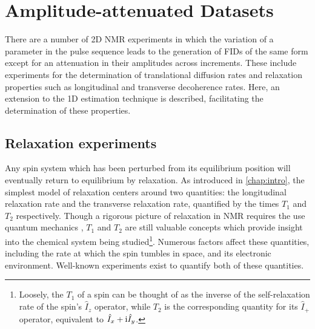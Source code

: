 \section{Amplitude-attenuated Datasets}
\label{sec:seq}
There are a number of \ac{2D} \ac{NMR} experiments in which the
variation of a parameter in the pulse sequence leads to the generation of
\acp{FID} of the same form except for an attenuation in their amplitudes across
increments. These include experiments for the determination of translational
diffusion rates and relaxation properties such as longitudinal and transverse
decoherence rates. Here, an extension to the \ac{1D} estimation technique is
described, facilitating the determination of these properties.

\subsection{Relaxation experiments}
\label{subsec:relaxation_experiments}
Any spin system which has been perturbed from its equilibrium position will
eventually return to equilibrium by relaxation. As introduced in
\cref{chap:intro}, the simplest model of relaxation centers around two
quantities: the longitudinal relaxation rate and the transverse relaxation
rate, quantified by the times $T_1$ and  $T_2$ respectively. Though a rigorous
picture of relaxation in \ac{NMR} requires the use quantum mechanics
\parencites[Chapter 5]{Cavanagh2007}{Goldman2001}{Kuprov2007}, $T_1$ and $T_2$
are still valuable concepts which provide insight into the chemical system
being studied\footnote{
    Loosely, the $T_1$ of a spin can be thought of as the inverse of the
    self-relaxation rate of the spin's $\hat{I}_z$ operator, while $T_2$ is the
    corresponding quantity for its $\hat{I}_+$ operator, equivalent to
    $\hat{I}_x + \mathrm{i} \hat{I}_y$.
}.
Numerous factors affect these quantities, including the rate at which the spin
tumbles in space, and its electronic environment. Well-known experiments exist
to quantify both of these quantities.


